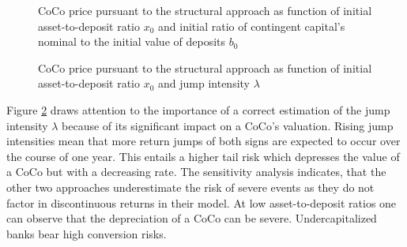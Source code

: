\begin{figure}[H]
\centering
    \caption[CoCo price pursuant to the structural approach as function of asset-to-deposit ratio and initial ratio of contingent capital's nominal to deposits]{CoCo price pursuant to the structural approach as function of initial asset-to-deposit ratio $x_0$ and initial ratio of contingent capital's nominal to the initial value of deposits $b_0$}
  \label{fig:sa5}
  \end{figure}

\begin{figure}[H]
\centering
    \caption[CoCo price pursuant to the structural approach as function of asset-to-deposit ratio and jump intensity]{CoCo price pursuant to the structural approach as function of initial asset-to-deposit ratio $x_0$ and jump intensity $\lambda$}
  \label{fig:sa4}
  \end{figure}
  
Figure \ref{fig:sa4} draws attention to the importance of a correct estimation of the jump intensity $\lambda$ because of its significant impact on a CoCo's valuation. Rising jump intensities mean that more return jumps of both signs are expected to occur over the course of one year. This entails a higher tail risk which depresses the value of a CoCo but with a decreasing rate. The sensitivity analysis indicates, that the other two approaches underestimate the risk of severe events as they do not factor in discontinuous returns in their model. At low asset-to-deposit ratios one can observe that the depreciation of a CoCo can be severe. Undercapitalized banks bear high conversion risks.
 
  
  

